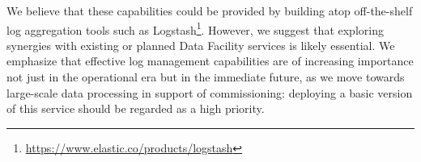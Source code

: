 We believe that these capabilities could be provided by building atop
off-the-shelf log aggregation tools such as
Logstash\footnote{\url{https://www.elastic.co/products/logstash}}. However, we
suggest that exploring synergies with existing or planned Data Facility
services is likely essential. We emphasize that effective log management
capabilities are of increasing importance not just in the operational era but
in the immediate future, as we move towards large-scale data processing in
support of commissioning: deploying a basic version of this service should be
regarded as a high priority.
